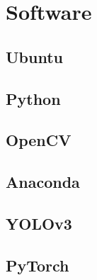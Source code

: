 \section{Software}
\label{sec:software}

\subsection{Ubuntu}
\label{sec:ubuntu}

\subsection{Python}
\label{sec:python}

\subsection{OpenCV}
\label{sec:OpenCV}

\subsection{Anaconda}
\label{sec:Anaconda}

\subsection{YOLOv3}
\label{sec:YOLOv3}

\subsection{PyTorch}
\label{sec:PyTorch}


